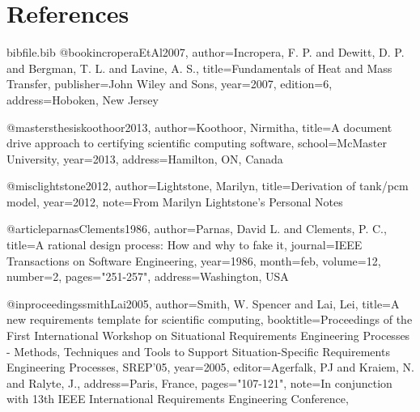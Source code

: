 \documentclass[12pt]{article}
\begin{document}
\section{References}
\label{Sec:References}
\begin{filecontents*}{bibfile.bib}
@book{incroperaEtAl2007,
author={Incropera, F. P. and Dewitt, D. P. and Bergman, T. L. and Lavine, A. S.},
title={Fundamentals of Heat and Mass Transfer},
publisher={John Wiley and Sons},
year={2007},
edition={6},
address={Hoboken, New Jersey}}

@mastersthesis{koothoor2013,
author={Koothoor, Nirmitha},
title={A document drive approach to certifying scientific computing software},
school={McMaster University},
year={2013},
address={Hamilton, ON, Canada}}

@misc{lightstone2012,
author={Lightstone, Marilyn},
title={Derivation of tank/pcm model},
year={2012},
note={From Marilyn Lightstone's Personal Notes}}

@article{parnasClements1986,
author={Parnas, David L. and Clements, P. C.},
title={A rational design process: How and why to fake it},
journal={IEEE Transactions on Software Engineering},
year={1986},
month={feb},
volume={12},
number={2},
pages={"251-257"},
address={Washington, USA}}

@inproceedings{smithLai2005,
author={Smith, W. Spencer and Lai, Lei},
title={A new requirements template for scientific computing},
booktitle={Proceedings of the First International Workshop on Situational Requirements Engineering Processes - Methods, Techniques and Tools to Support Situation-Specific Requirements Engineering Processes, SREP'05},
year={2005},
editor={Agerfalk, PJ and Kraiem, N. and Ralyte, J.},
address={Paris, France},
pages={"107-121"},
note={In conjunction with 13th IEEE International Requirements Engineering Conference,}}
\end{filecontents*}
\nocite{*}
\printbibliography[heading=none]
\end{document}

